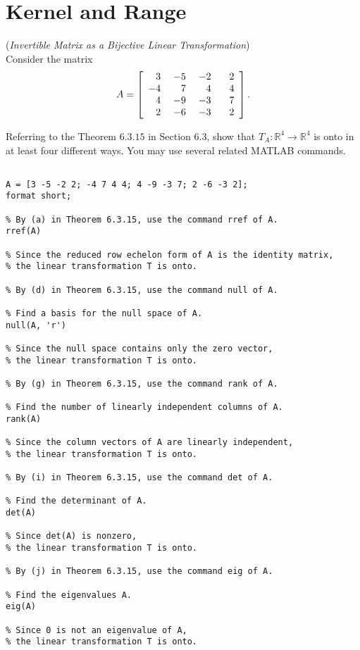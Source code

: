\section{Kernel and Range}


\begin{exer}
(\textit{Invertible Matrix as a Bijective Linear Transformation})\\
Consider the matrix
\begin{displaymath}
A = \left[\begin{array}{rrrr} 3& \hspace{1mm} -5& \hspace{1mm} -2&\hspace{3mm} 2\\ -4 & 7 & 4 & 4 \\ 4 & -9 & -3 & 7 \\ 2 & -6 & -3 & 2 \end{array} \right].
\end{displaymath}

\vspace{2mm}
Referring to the Theorem $6.3.15$ in Section $6.3$, show that $T_{A} : \mathbb{R}^{4} \rightarrow \mathbb{R}^{4}$ is onto in at least four different ways. You may use several related MATLAB commands.

\end{exer}


\begin{sol}
\begin{verbatim}

A = [3 -5 -2 2; -4 7 4 4; 4 -9 -3 7; 2 -6 -3 2];
format short;

% By (a) in Theorem 6.3.15, use the command rref of A.
rref(A)

% Since the reduced row echelon form of A is the identity matrix,
% the linear transformation T is onto.

% By (d) in Theorem 6.3.15, use the command null of A.

% Find a basis for the null space of A.
null(A, 'r') 

% Since the null space contains only the zero vector,
% the linear transformation T is onto.

% By (g) in Theorem 6.3.15, use the command rank of A.

% Find the number of linearly independent columns of A.
rank(A) 

% Since the column vectors of A are linearly independent,
% the linear transformation T is onto.

% By (i) in Theorem 6.3.15, use the command det of A.

% Find the determinant of A.
det(A) 

% Since det(A) is nonzero,
% the linear transformation T is onto.

% By (j) in Theorem 6.3.15, use the command eig of A.

% Find the eigenvalues A.
eig(A) 

% Since 0 is not an eigenvalue of A,
% the linear transformation T is onto.
\end{verbatim}
\end{sol}



